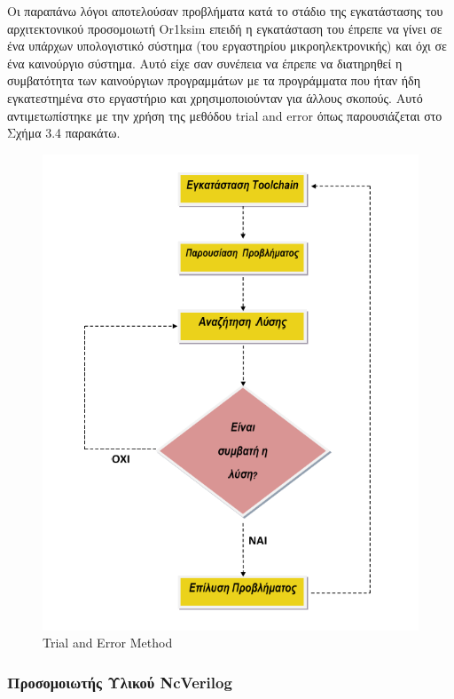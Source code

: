 \documentclass[a4paper,10pt]{article}
\numberwithin{figure}{section}
\numberwithin{table}{section}
\begin{document}
Οι παραπάνω λόγοι αποτελούσαν προβλήματα κατά το στάδιο της εγκατάστασης του αρχιτεκτονικού προσομοιωτή Or1ksim επειδή η εγκατάσταση του έπρεπε να γίνει σε ένα υπάρχων υπολογιστικό σύστημα (του εργαστηρίου μικροηλεκτρονικής) και όχι σε ένα καινούργιο σύστημα. Αυτό είχε σαν συνέπεια να έπρεπε να διατηρηθεί η συμβατότητα των καινούργιων προγραμμάτων με τα προγράμματα που ήταν ήδη εγκατεστημένα στο εργαστήριο και χρησιμοποιούνταν για άλλους σκοπούς. Αυτό αντιμετωπίστηκε με την χρήση της μεθόδου trial and error όπως παρουσιάζεται στο Σχήμα 3.4 παρακάτω.

\vspace{0.7cm}
\begin{figure}[h!]
 \centering
 \includegraphics[bb=0 0 586 741,scale=0.4]{./Images/trial_and_error.png}
 \caption{Trial and Error Method}
\end{figure}
\vspace{0.7cm}
\newpage


\subsubsection{Προσομοιωτής Υλικού NcVerilog}
\end{document}
